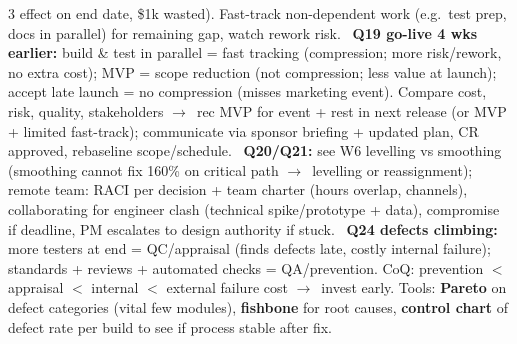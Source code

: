 \documentclass[a4paper,landscape]{article}
\newcommand{\lbl}[1]{\textbf{#1}}
\newcommand{\kh}[1]{{\setlength{\fboxsep}{0.5pt}\colorbox{keyhlcolor}{#1}}}
\newcommand{\ra}{$\rightarrow$}
\begin{document}
\begin{multicols}{3}
effect on end date, \$1k wasted). Fast-track non-dependent work (e.g.\ test prep, docs in parallel) for remaining gap, watch rework risk. \textbullet\ \lbl{Q19 go-live 4 wks earlier:} build \& test in parallel = \kh{fast tracking} (compression; more risk/rework, no extra cost); MVP = \kh{scope reduction} (not compression; less value at launch); accept late launch = no compression (misses marketing event). Compare cost, risk, quality, stakeholders \ra\ rec MVP for event + rest in next release (or MVP + limited fast-track); communicate via sponsor briefing + updated plan, CR approved, rebaseline scope/schedule. \textbullet\ \lbl{Q20/Q21:} see W6 levelling vs smoothing (smoothing cannot fix 160\% on critical path \ra\ levelling or reassignment); remote team: RACI per decision + team charter (hours overlap, channels), collaborating for engineer clash (technical spike/prototype + data), compromise if deadline, PM escalates to design authority if stuck. \textbullet\ \lbl{Q24 defects climbing:} more testers at end = QC/appraisal (finds defects late, costly internal failure); standards + reviews + automated checks = QA/prevention. CoQ: \kh{prevention $<$ appraisal $<$ internal $<$ external failure} cost \ra\ invest early. Tools: \lbl{Pareto} on defect categories (vital few modules), \lbl{fishbone} for root causes, \lbl{control chart} of defect rate per build to see if process stable after fix.\par

\end{multicols}
\end{document}
